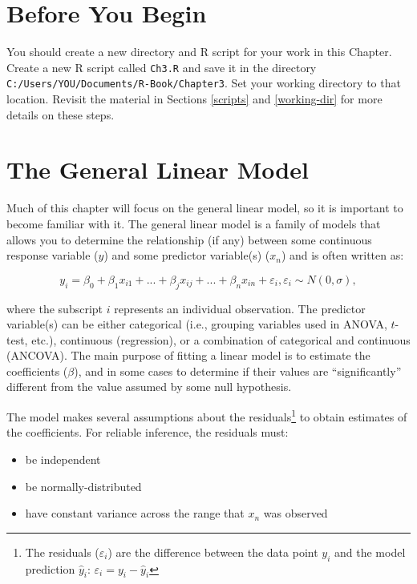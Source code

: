 \documentclass[]{book}
\providecommand{\tightlist}{%
  \setlength{\itemsep}{0pt}\setlength{\parskip}{0pt}}
\let\rmarkdownfootnote\footnote%
\def\footnote{\protect\rmarkdownfootnote}
\begin{document}
\hypertarget{before-you-begin-2}{%
\section*{Before You Begin}\label{before-you-begin-2}}

You should create a new directory and R script for your work in this Chapter. Create a new R script called \texttt{Ch3.R} and save it in the directory \texttt{C:/Users/YOU/Documents/R-Book/Chapter3}. Set your working directory to that location. Revisit the material in Sections \ref{scripts} and \ref{working-dir} for more details on these steps.

\hypertarget{lm}{%
\section{The General Linear Model}\label{lm}}

Much of this chapter will focus on the general linear model, so it is important to become familiar with it. The general linear model is a family of models that allows you to determine the relationship (if any) between some continuous response variable (\(y\)) and some predictor variable(s) (\(x_n\)) and is often written as:

\begin{equation}
  y_i=\beta_0 + \beta_1 x_{i1} + ... + \beta_j x_{ij}+ ... + \beta_n x_{in} + \varepsilon_i, \varepsilon_i \sim N(0,\sigma),
\label{eq:lin-mod}
\end{equation}

where the subscript \(i\) represents an individual observation. The predictor variable(s) can be either categorical (i.e., grouping variables used in ANOVA, \(t\)-test, etc.), continuous (regression), or a combination of categorical and continuous (ANCOVA). The main purpose of fitting a linear model is to estimate the coefficients (\(\beta\)), and in some cases to determine if their values are ``significantly'' different from the value assumed by some null hypothesis.

The model makes several assumptions about the residuals\footnote{The residuals (\(\varepsilon_i\)) are the difference between the data point \(y_i\) and the model prediction \(\hat{y}_i\): \(\varepsilon_i=y_i-\hat{y}_i\)} to obtain estimates of the coefficients. For reliable inference, the residuals must:

\begin{itemize}
\tightlist
\item
  be independent
\item
  be normally-distributed
\item
  have constant variance across the range that \(x_n\) was observed
\end{itemize}
\end{document}
